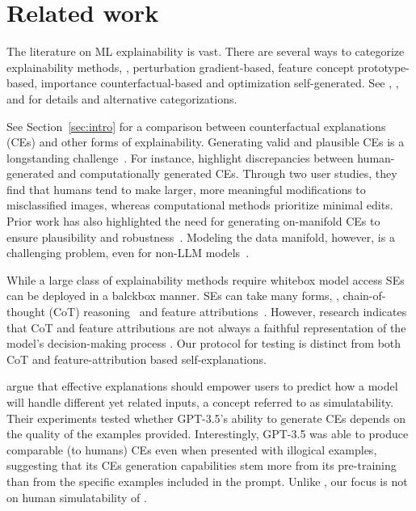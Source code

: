 \section{Related work}
The literature on ML explainability is vast. There are several ways to categorize explainability methods, \eg, perturbation \vs gradient-based, feature \vs concept \vs prototype-based, importance \vs counterfactual-based and optimization \vs self-generated.
See \citet{gilpin2018explaining}, \citet{10.1145/3236009}, and \citet{zhao2024explainability} for details and alternative categorizations. 



See Section~\ref{sec:intro} for a comparison between counterfactual explanations (CEs) and other forms of explainability.
Generating valid and plausible CEs is a longstanding challenge~\cite{verma2024counterfactual}.
For instance, \citet{delaney2023counterfactual} highlight discrepancies between human-generated and computationally generated CEs. Through two user studies, they find that humans tend to make larger, more meaningful modifications to misclassified images, whereas computational methods prioritize minimal edits.
Prior work has also highlighted the need for generating on-manifold CEs to ensure plausibility and robustness~\cite{tsiourvas2024manifold,slack2021counterfactual}. Modeling the data manifold, however, is a challenging problem, even for non-LLM models~\cite{arvanitidis2016locally}.





While a large class of explainability methods require whitebox model access SEs can be deployed in a balckbox manner.
SEs can take many forms, \eg, chain-of-thought (CoT) reasoning~\citep{agarwal2024faithfulness} and feature attributions~\cite{tanneru2024quantifying}.
However, research indicates that CoT and feature attributions are not always a faithful representation of the model's decision-making process \citep{turpin2024language,lanham2023measuring,tanneru2024quantifying}.
Our protocol for testing \SCEs is distinct from both CoT and feature-attribution based self-explanations.

\citet{chen2023models} argue that effective explanations should empower users to predict how a model will handle different yet related inputs, a concept referred to as simulatability. 
Their experiments tested whether GPT-3.5's ability to generate CEs depends on the quality of the examples provided. Interestingly, GPT-3.5 was able to produce comparable (to humans) CEs even when presented with illogical examples, suggesting that its CEs generation capabilities stem more from its pre-training than from the specific examples included in the prompt.
Unlike \citet{chen2023models}, our focus is not on human simulatability of \SCEs.


